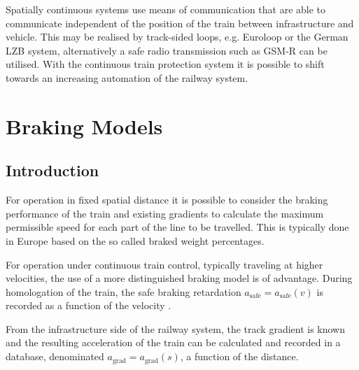 \documentclass[a4paper, 12pt]{scrartcl}
\begin{document}
Spatially continuous systems use means of communication that are able to communicate independent of the position of the train between infrastructure and vehicle. This may be realised by track-sided loops, e.g. Euroloop or the German LZB system, alternatively a safe radio transmission such as GSM-R can be utilised. With the continuous train protection system it is possible to shift towards an increasing automation of the railway system. 

\section{Braking Models}
\subsection{Introduction}
For operation in fixed spatial distance it is possible to consider the braking performance of the train and existing gradients to calculate the maximum permissible speed for each part of the line to be travelled. This is typically done in Europe based on the so called braked weight percentages. 

For operation under continuous train control, typically traveling at higher velocities, the use of a more distinguished braking model is of advantage. During homologation of the train, the safe braking retardation $a_{\text{safe}} = a_{\text{safe}}(v)$ is recorded as a function of the velocity \cite{gropler2008bremswege}.

From the infrastructure side of the railway system, the track gradient is known and the resulting acceleration of the train can be calculated and recorded in a database, denominated $a_{\text{grad}} = a_{\text{grad}}(s)$, a function of the distance.
\end{document}
